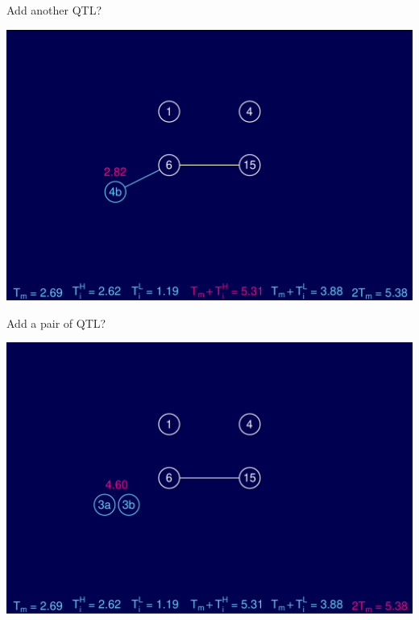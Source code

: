 \documentclass[12pt]{article}
\newcommand{\headsize}{\fontsize{35}{35} \selectfont}
\begin{document}
\newpage


\addtocounter{page}{-1}

\headsize \color{myyellow}
\hfill \begin{minipage}{5.75in}
\centering
Add another QTL?
\end{minipage}

\vfill


\centerline{\includegraphics{FigsB/hyper_models11.pdf}}



\newpage



\headsize \color{myyellow}
\hfill \begin{minipage}{5.75in}
\centering
Add a pair of QTL?
\end{minipage}

\vfill


\centerline{\includegraphics{FigsB/hyper_models12.pdf}}
\end{document}

